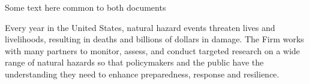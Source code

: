 \documentclass{article}
\begin{document}
Some text here common to both documents

Every year in the United States, natural hazard events threaten lives and livelihoods, resulting in deaths and billions of dollars in damage. The Firm works with many partners to monitor, assess, and conduct targeted research on a wide range of natural hazards so that policymakers and the public have the understanding they need to enhance preparedness, response and resilience.
\end{document}

